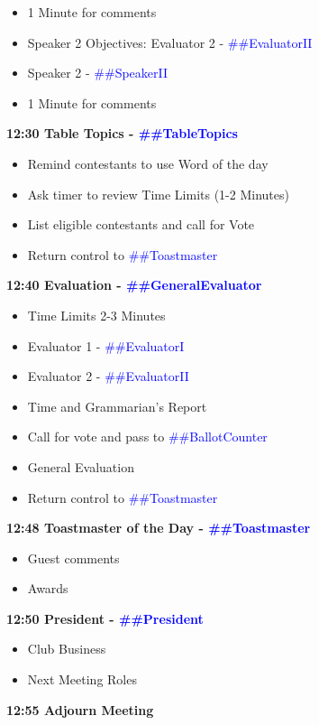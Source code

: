 \documentclass{article}
\newcommand{\toastmaster}{##Toastmaster}
\newcommand{\president}{##President}
\newcommand{\tableTopics}{##TableTopics}
\newcommand{\generalEvaluator}{##GeneralEvaluator}
\newcommand{\evaluatorI}{##EvaluatorI}
\newcommand{\evaluatorII}{##EvaluatorII}
\newcommand{\speakerII}{##SpeakerII}
\newcommand{\ballotCounter}{##BallotCounter}
\newcommand{\speechITitle}{##SpeechITitle}
\newcommand{\speechIProject}{##SpeechIProject}
\newcommand{\speechITimeConstraints}{##SpeechITimeConstraints}
\newcommand{\speechIITitle}{##SpeechIITitle}
\newcommand{\speechIIProject}{##SpeechIIProject}
\newcommand{\speechIITimeConstraints}{##SpeechIITimeConstraints}
\begin{document}
\begin{spacing}{.8}
\begin{itemize}
    \item 1 Minute for comments
    \item Speaker 2 Objectives: Evaluator 2 - \textcolor{blue}{\evaluatorII{}}
    \item Speaker 2 - \textcolor{blue}{\speakerII{}}
    \item 1 Minute for comments
  \end{itemize}
  {\Large \bf12:30 Table Topics - \textcolor{blue}{\tableTopics{}}} 
  \begin{itemize}
    \item Remind contestants to use Word of the day
    \item Ask timer to review Time Limits  (1-2 Minutes)
    \item List eligible contestants and call for Vote
    \item Return control to \textcolor{blue}{\toastmaster{}}
  \end{itemize}
  {\Large \bf12:40 Evaluation - \textcolor{blue}{\generalEvaluator{}}} 
  \begin{itemize}
    \item Time Limits 2-3 Minutes
    \item Evaluator 1 - \textcolor{blue}{\evaluatorI{}}
    \item Evaluator 2 - \textcolor{blue}{\evaluatorII{}}
	\item Time and Grammarian's Report
    \item Call for vote and pass to \textcolor{blue}{\ballotCounter{}}
	\item General Evaluation
    \item Return control to \textcolor{blue}{\toastmaster{}}
  \end{itemize}
  {\Large \bf12:48 Toastmaster of the Day - \textcolor{blue}{\toastmaster{}}} 
  \begin{itemize}
    \item Guest comments
    \item Awards
  \end{itemize}
  {\Large \bf12:50 President - \textcolor{blue}{\president{}}} 
  \begin{itemize}
    \item Club Business
    \item Next Meeting Roles
  \end{itemize}
  {\Large \bf12:55 Adjourn Meeting} 
  \end{spacing}
  
\end{document}
